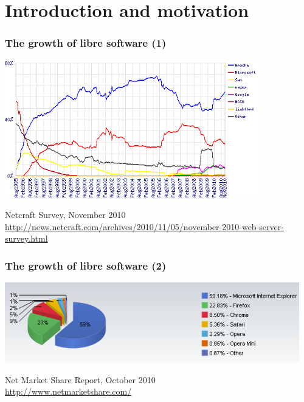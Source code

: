 
\section{Introduction and motivation}


\begin{frame}
\frametitle{The growth of libre software (1)}

\includegraphics[height=6cm]{figs/webservers-share-2010-11}

\begin{flushright}
Netcraft Survey, November 2010 \\
{\small \url{http://news.netcraft.com/archives/2010/11/05/november-2010-web-server-survey.html}}
\end{flushright}
\end{frame}


\begin{frame}
\frametitle{The growth of libre software (2)}

\includegraphics[height=3.5cm]{figs/webbrowsers-share-2010-10}

\begin{flushright}
Net Market Share Report, October 2010 \\
{\small \url{http://www.netmarketshare.com/}}
\end{flushright}
\end{frame}

